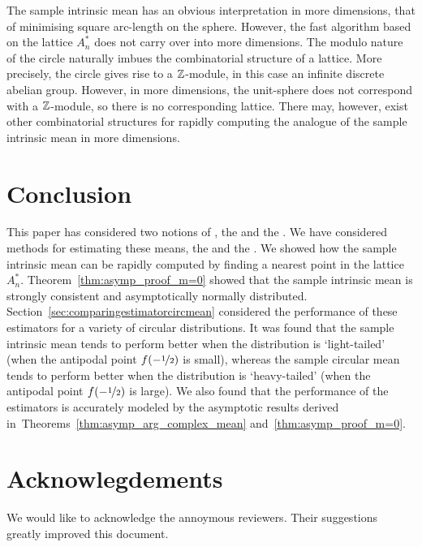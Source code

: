 \documentclass[journal]{../bib/IEEEtran}
\begin{document}
The sample intrinsic mean has an obvious interpretation in more dimensions, that of minimising square arc-length on the sphere. However, the fast algorithm based on the lattice $A_n^*$ does not carry over into more dimensions. The modulo nature of the circle naturally imbues the combinatorial structure of a lattice. More precisely, the circle gives rise to a ${\mathbb Z}$-module, in this case an infinite discrete abelian group. However, in more dimensions, the unit-sphere does not correspond with a ${\mathbb Z}$-module, so there is no corresponding lattice. There may, however, exist other combinatorial structures for rapidly computing the analogue of the sample intrinsic mean in more dimensions.

\section{Conclusion}

This paper has considered two notions of , the  and the . We have considered methods for estimating these means, the  and the .  We showed how the sample intrinsic mean can be rapidly computed by finding a nearest point in the lattice $A_n^*$. Theorem~\ref{thm:asymp_proof_m=0} showed that the sample intrinsic mean is strongly consistent and asymptotically normally distributed. Section~\ref{sec:comparingestimatorcircmean} considered the performance of these estimators for a variety of circular distributions.  It was found that the sample intrinsic mean tends to perform better when the distribution is `light-tailed' (when the antipodal point $f(-\nicefrac{1}{2})$ is small), whereas the sample circular mean tends to perform better when the distribution is `heavy-tailed' (when the antipodal point $f(-\nicefrac{1}{2})$ is large). We also found that the performance of the estimators is accurately modeled by the asymptotic results derived in~Theorems~\ref{thm:asymp_arg_complex_mean} and~\ref{thm:asymp_proof_m=0}.


\section{Acknowlegdements}
We would like to acknowledge the annoymous reviewers.  Their suggestions greatly improved this document.

\appendix
\end{document}
